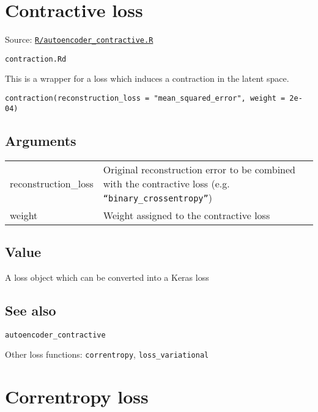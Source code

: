 \section{Contractive loss}\label{contractive-loss}

Source:
\href{https://github.com/fdavidcl/ruta/blob/master/R/autoencoder_contractive.R}{\texttt{R/autoencoder\_contractive.R}}

\texttt{contraction.Rd}

This is a wrapper for a loss which induces a contraction in the latent
space.

\begin{verbatim}
contraction(reconstruction_loss = "mean_squared_error", weight = 2e-04)
\end{verbatim}

\hypertarget{arguments}{\subsection{\texorpdfstring{\protect\hyperlink{arguments}{}Arguments}{Arguments}}\label{arguments}}

\begin{longtable}[c]{@{}>{\small}p{3cm}>{\raggedright}p{12.5cm}@{}}
\toprule
reconstruction\_loss & Original reconstruction error to be combined with
the contractive loss (e.g.
\texttt{``binary\_crossentropy''})\tabularnewline
weight & Weight assigned to the contractive loss\tabularnewline
\bottomrule
\end{longtable}

\hypertarget{value}{\subsection{\texorpdfstring{\protect\hyperlink{value}{}Value}{Value}}\label{value}}

A loss object which can be converted into a Keras loss

\hypertarget{see-also}{\subsection{\texorpdfstring{\protect\hyperlink{see-also}{}See
also}{See also}}\label{see-also}}

\texttt{autoencoder\_contractive}

Other loss functions: \texttt{correntropy}, \texttt{loss\_variational}

\section{Correntropy loss}\label{correntropy-loss}

